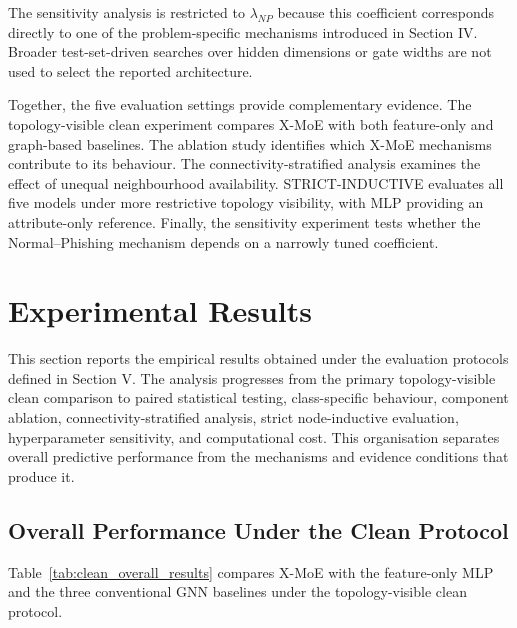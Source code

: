 \documentclass{ieeeaccess}
\begin{document}
The sensitivity analysis is restricted to \(\lambda_{NP}\) because this coefficient corresponds directly to one of the problem-specific mechanisms introduced in Section IV. Broader test-set-driven searches over hidden dimensions or gate widths are not used to select the reported architecture.

Together, the five evaluation settings provide complementary evidence. The topology-visible clean experiment compares X-MoE with both feature-only and graph-based baselines. The ablation study identifies which X-MoE mechanisms contribute to its behaviour. The connectivity-stratified analysis examines the effect of unequal neighbourhood availability. STRICT-INDUCTIVE evaluates all five models under more restrictive topology visibility, with MLP providing an attribute-only reference. Finally, the sensitivity experiment tests whether the Normal--Phishing mechanism depends on a narrowly tuned coefficient.




\section{Experimental Results}

This section reports the empirical results obtained under the evaluation protocols defined in Section V. The analysis progresses from the primary topology-visible clean comparison to paired statistical testing, class-specific behaviour, component ablation, connectivity-stratified analysis, strict node-inductive evaluation, hyperparameter sensitivity, and computational cost. This organisation separates overall predictive performance from the mechanisms and evidence conditions that produce it.

\subsection{Overall Performance Under the Clean Protocol}

Table~\ref{tab:clean_overall_results} compares X-MoE with the feature-only MLP and the three conventional GNN baselines under the topology-visible clean protocol.
\end{document}
